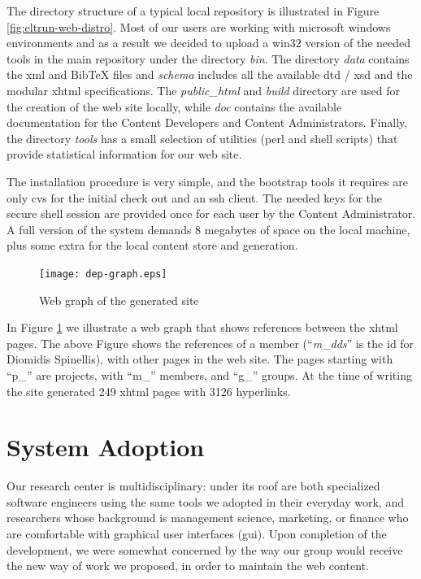\documentclass{elsart}
\begin{document}
The directory structure of a typical 
local repository is illustrated in Figure \ref{fig:eltrun-web-distro}.
Most of our users are working with {\sc microsoft windows} environments and as 
a result we decided to upload a {\sc win32} version of the needed tools 
in the main repository under the directory \textit{bin}.
The directory \textit{data} contains the {\sc xml} and {\sc BibTeX} files and \textit{schema}
includes all the available {\sc dtd / xsd} and the modular {\sc xhtml} specifications.
The \textit{public\_html} and \textit{build} directory are used for the creation of the 
web site locally, while \textit{doc} contains the available documentation for the Content Developers
and Content Administrators. Finally, the directory \textit{tools} has a small selection 
of utilities ({\sc perl} and shell scripts) that provide statistical information
for our web site.

The installation procedure is very simple,
and the bootstrap tools it requires are only {\sc cvs} for 
the initial check out and an {\sc ssh} client. The needed keys 
for the secure shell session are provided once for each user by the Content Administrator. 
A full version of the system demands 8 megabytes of space 
on the local machine, plus some extra for the local content store and generation.

\begin{figure}
\texttt{[image: dep-graph.eps]}
\caption{Web graph of the generated site}
\label{fig:eltrun-web-m-dds-snapshot}
\end{figure}

In Figure \ref{fig:eltrun-web-m-dds-snapshot} we illustrate a web graph \cite{KRRSTU00} 
that shows references between the {\sc xhtml} pages.
The above Figure shows the references  of a member (``\textit{m\_dds}'' is the {\sc id} for 
Diomidis Spinellis), with other pages in the web site.
The pages starting with ``p\_'' are projects, with ``m\_'' members, and ``g\_'' groups.
At the time of writing the site generated 249 {\sc xhtml} pages with 3126 hyperlinks. 

\section{System Adoption}
\label{sec:adopt}

Our research center is multidisciplinary: under its roof
are both specialized software engineers using the same tools
we adopted in their everyday work, and researchers whose
background is management science, marketing, or finance
who are comfortable with graphical user interfaces ({\sc gui}).
Upon completion of the development, we were somewhat concerned by the way our group
would receive the new way of work we proposed, in order to maintain the web content.
\end{document}
